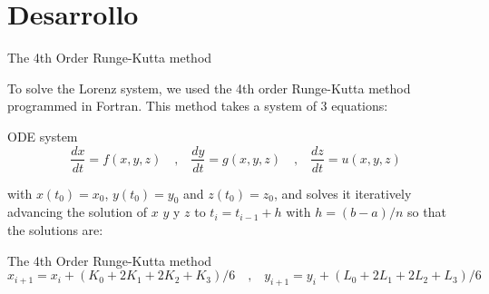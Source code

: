 \documentclass[hyperref={pdfpagelabels=false}]{beamer}
\begin{document}
\section{Desarrollo} 
\begin{frame}{The 4th Order Runge-Kutta method} 

To solve the Lorenz system, we used the 4th order Runge-Kutta method programmed in Fortran. This method takes a system of 3 equations:

\begin{block}{ODE system}
\begin{equation*}
\frac{dx}{dt}=f(x,y,z) \quad \text{,} \quad \frac{dy}{dt}=g(x,y,z) \quad \text{,} \quad \frac{dz}{dt}=u(x,y,z)
\end{equation*}
\end{block}

\vspace{10pt}

with $x(t_{0})=x_{0}$, $y(t_{0})=y_{0}$ and $z(t_{0})=z_{0}$, and solves it iteratively advancing the solution of $x$ $y$ y $z$ to $t_{i}=t_{i-1}+h$ with $h=(b-a)/n$ so that the solutions are:

\begin{block}{The 4th Order Runge-Kutta method}
\begin{equation*}
x_{i+1}=x_{i}+(K_{0}+2K_{1}+2K_{2}+K_{3})/6 \quad \text{,} \quad y_{i+1}=y_{i}+(L_{0}+2L_{1}+2L_{2}+L_{3})/6 
\end{equation*}
\end{block}




\end{frame}
\end{document}
